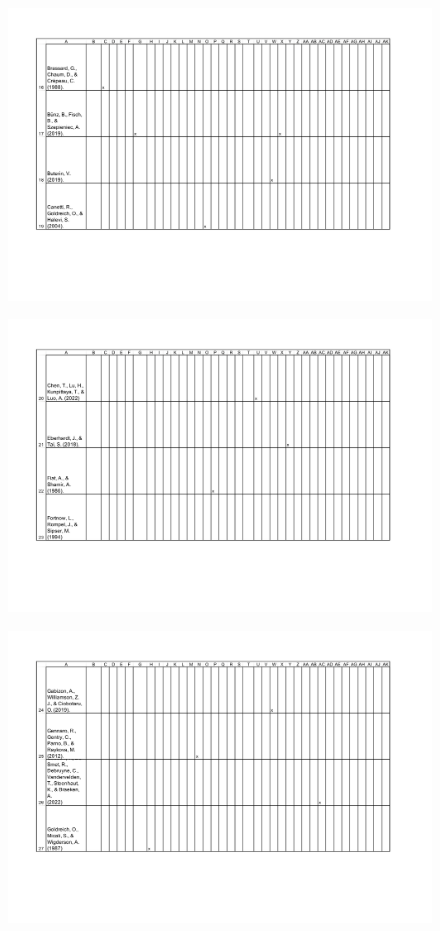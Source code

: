 \begin{figure}[H]
	\centering
		\includegraphics[width=1.0\textwidth]{Pictures/concept_matrix/wos-05.png}
\end{figure}

\begin{figure}[H]
	\centering
		\includegraphics[width=1.0\textwidth]{Pictures/concept_matrix/wos-06.png}
\end{figure}

\begin{figure}[H]
	\centering
		\includegraphics[width=1.0\textwidth]{Pictures/concept_matrix/wos-07.png}
\end{figure}

